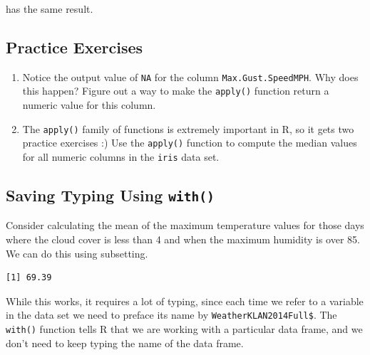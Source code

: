 \documentclass[]{krantz}
\makeatletter
\newenvironment{Shaded}{\begin{snugshade}}{\end{snugshade}}
\newcommand{\KeywordTok}[1]{\textcolor[rgb]{0.27,0.27,0.27}{\textbf{#1}}}
\newcommand{\DecValTok}[1]{\textcolor[rgb]{0.06,0.06,0.06}{#1}}
\newcommand{\StringTok}[1]{\textcolor[rgb]{0.5,0.5,0.5}{#1}}
\newcommand{\OperatorTok}[1]{\textcolor[rgb]{0.43,0.43,0.43}{\textbf{#1}}}
\newcommand{\NormalTok}[1]{#1}
\providecommand{\tightlist}{%
  \setlength{\itemsep}{0pt}\setlength{\parskip}{0pt}}
\newenvironment{kframe}{%
\medskip{}
\setlength{\fboxsep}{.8em}
 \def\at@end@of@kframe{}%
 \ifinner\ifhmode%
  \def\at@end@of@kframe{\end{minipage}}%
  \begin{minipage}{\columnwidth}%
 \fi\fi%
 \def\FrameCommand##1{\hskip\@totalleftmargin \hskip-\fboxsep
 \colorbox{shadecolor}{##1}\hskip-\fboxsep
     \hskip-\linewidth \hskip-\@totalleftmargin \hskip\columnwidth}%
 \MakeFramed {\advance\hsize-\width
   \@totalleftmargin\z@ \linewidth\hsize
   \@setminipage}}%
 {\par\unskip\endMakeFramed%
 \at@end@of@kframe}
\renewenvironment{Shaded}{\begin{kframe}}{\end{kframe}}
\makeatother
\begin{document}
has the same result.

\subsection{Practice Exercises}\label{practice-exercises}

\begin{enumerate}
\def\labelenumi{\arabic{enumi}.}
\tightlist
\item
  Notice the output value of \texttt{NA} for the column
  \texttt{Max.Gust.SpeedMPH}. Why does this happen? Figure out a way to
  make the \texttt{apply()} function return a numeric value for this
  column.
\item
  The \texttt{apply()} family of functions is extremely important in R,
  so it gets two practice exercises :) Use the \texttt{apply()} function
  to compute the median values for all numeric columns in the
  \texttt{iris} data set.
\end{enumerate}

\subsection{\texorpdfstring{Saving Typing Using
\texttt{with()}}{Saving Typing Using with()}}\label{saving-typing-using-with}

Consider calculating the mean of the maximum temperature values for
those days where the cloud cover is less than 4 and when the maximum
humidity is over 85. We can do this using subsetting.

\begin{Shaded}
\end{Shaded}

\begin{verbatim}
[1] 69.39
\end{verbatim}

While this works, it requires a lot of typing, since each time we refer
to a variable in the data set we need to preface its name by
\texttt{WeatherKLAN2014Full\$}. The \texttt{with()} function tells R
that we are working with a particular data frame, and we don't need to
keep typing the name of the data frame.
\end{document}
